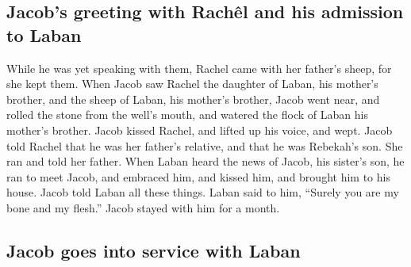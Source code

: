 \begin{paracol}{2}
\begin{otherlanguage}{english}
\hypertarget{jacobs-greeting-with-rachuxeal-and-his-admission-to-laban}{%
\subsection{Jacob's greeting with Rachêl and his admission to
Laban}\label{jacobs-greeting-with-rachuxeal-and-his-admission-to-laban}}

 While he was yet speaking with them, Rachel came with her
father's sheep, for she kept them.  When Jacob saw Rachel
the daughter of Laban, his mother's brother, and the sheep of Laban, his
mother's brother, Jacob went near, and rolled the stone from the well's
mouth, and watered the flock of Laban his mother's brother.
 Jacob kissed Rachel, and lifted up his voice, and wept.
 Jacob told Rachel that he was her father's relative, and
that he was Rebekah's son. She ran and told her father. 
When Laban heard the news of Jacob, his sister's son, he ran to meet
Jacob, and embraced him, and kissed him, and brought him to his house.
Jacob told Laban all these things.  Laban said to him,
``Surely you are my bone and my flesh.'' Jacob stayed with him for a
month.

\hypertarget{jacob-goes-into-service-with-laban}{%
\subsection{Jacob goes into service with
Laban}\label{jacob-goes-into-service-with-laban}}


\end{otherlanguage}
\end{paracol}
